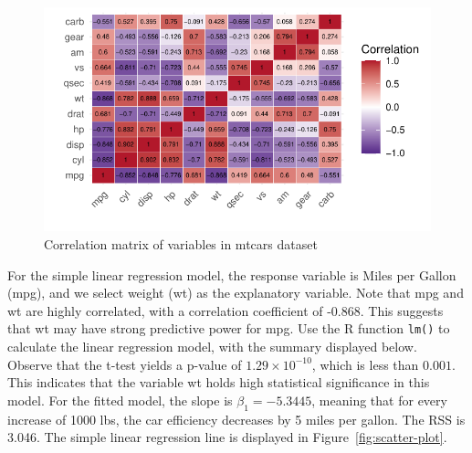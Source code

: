\documentclass{article}\usepackage[]{graphicx}\usepackage[]{xcolor}
\makeatletter
\def\maxwidth{ %
  \ifdim\Gin@nat@width>\linewidth
    \linewidth
  \else
    \Gin@nat@width
  \fi
}
\newenvironment{knitrout}{}{} %
\makeatother
\begin{document}
\begin{knitrout}\scriptsize
{}\color{fgcolor}\begin{figure}[H]

{\centering \includegraphics[width=\maxwidth]{figure/beamer-cor-matrix-mtcars2-1} 

}

\caption[Correlation matrix of variables in mtcars dataset]{Correlation matrix of variables in mtcars dataset}\label{fig:cor-matrix-mtcars2}
\end{figure}

\end{knitrout}

\noindent
For the simple linear regression model, the response variable is Miles per Gallon (mpg), and we select weight (wt) as the explanatory variable. Note that mpg and wt are highly correlated, with a correlation coefficient of -0.868. This suggests that wt may have strong predictive power for mpg. Use the R function \texttt{lm()} to calculate the linear regression model, with the summary displayed below.\\

\noindent
Observe that the t-test yields a p-value of $1.29 \times 10^{-10}$, which is less than $0.001$. This indicates that the variable wt holds high statistical significance in this model. For the fitted model, the slope is $\beta_1 = -5.3445$, meaning that for every increase of 1000 lbs, the car efficiency decreases by 5 miles per gallon. The RSS is 3.046. The simple linear regression line is displayed in Figure~\ref{fig:scatter-plot}.
\end{document}

